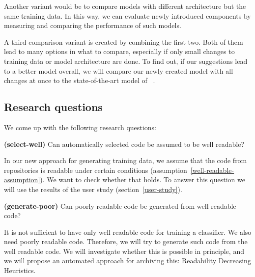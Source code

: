 \documentclass[%
class=scrreprt,
chapterprefix=false,%
open=right,%
twoside=false,%
paper=a4,%
logofile={Logo\_zentral\_farbig\_EN.png},%
thesistype=master,%
UKenglish,%
]{se2thesis}
\begin{document}
	Another variant would be to compare models with different architecture but the same training data. In this way, we can evaluate newly introduced components by measuring and comparing the performance of such models.

	A third comparison variant is created by combining the first two. Both of them lead to many options in what to compare, especially if only small changes to training data or model architecture are done. To find out, if our suggestions lead to a better model overall, we will compare our newly created model with all changes at once to the state-of-the-art model of \citeauthor{mi2022towards}~\cite{mi2022towards}.
	
	\subsection{Research questions}\label{research-questions}
	We come up with the following research questions:
	
	
	\begin{resq} \textbf{(select-well)} Can automatically selected code be assumed to be well readable?\end{resq} \label{select-well}
	In our new approach for generating training data, we assume that the code from repositories is readable under certain conditions (assumption~\ref{well-readable-assumption}). We want to check whether that holds. To answer this question we will use the results of the user study (section~\ref{user-study}).
	
	\begin{resq} \textbf{(generate-poor)} Can poorly readable code be generated from well readable code?\end{resq} \label{generate-poor}
	It is not sufficient to have only well readable code for training a classifier. We also need poorly readable code. Therefore, we will try to generate such code from the well readable code. We will investigate whether this is possible in principle, and we will propose an automated approach for archiving this: Readability Decreasing Heuristics.
	
\end{document}
